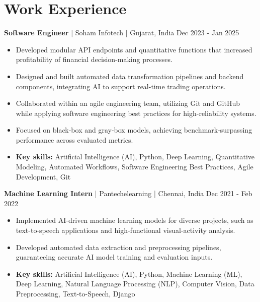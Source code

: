 \documentclass[a4paper,10pt]{article}
\begin{document}
\section*{Work Experience}
\textbf{Software Engineer} | Soham Infotech | Gujarat, India \hfill Dec 2023 - Jan 2025\par
\begin{itemize}
\item Developed modular API endpoints and quantitative functions that increased profitability of financial decision-making processes.
\item Designed and built automated data transformation pipelines and backend components, integrating AI to support real-time trading operations.
\item Collaborated within an agile engineering team, utilizing Git and GitHub while applying software engineering best practices for high-reliability systems.
\item Focused on black-box and gray-box models, achieving benchmark-surpassing performance across evaluated metrics.
\item \textbf{Key skills:} Artificial Intelligence (AI), Python, Deep Learning, Quantitative Modeling, Automated Workflows, Software Engineering Best Practices, Agile Development, Git
\end{itemize}
\vspace{3pt}
\textbf{Machine Learning Intern} | Pantechelearning | Chennai, India \hfill Dec 2021 - Feb 2022\par
\begin{itemize}
\item Implemented AI-driven machine learning models for diverse projects, such as text-to-speech applications and high-functional visual-activity analysis.
\item Developed automated data extraction and preprocessing pipelines, guaranteeing accurate AI model training and evaluation inputs.
\item \textbf{Key skills:} Artificial Intelligence (AI), Python, Machine Learning (ML), Deep Learning, Natural Language Processing (NLP), Computer Vision, Data Preprocessing, Text-to-Speech, Django
\end{itemize}
\vspace{3pt}
\end{document}
